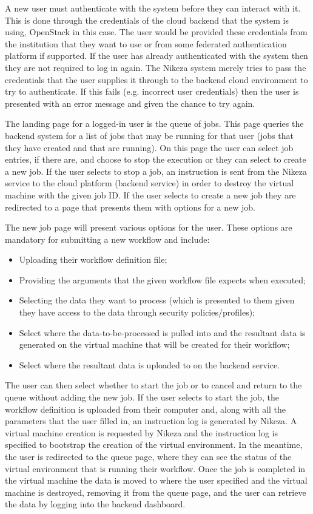  A new user must authenticate with the system before they can interact with it. This is done through the credentials of the cloud backend that the system is using, OpenStack in this case. The user would be provided these credentials from the institution that they want to use or from some federated authentication platform if supported. If the user has already authenticated with the system then they are not required to log in again. The Nikeza system merely tries to pass the credentials that the user supplies it through to the backend cloud environment to try to authenticate. If this fails (e.g. incorrect user credentials) then the user is presented with an error message and given the chance to try again.

The landing page for a logged-in user is the queue of jobs. This page queries the backend system for a list of jobs that may be running for that user (jobs that they have created and that are running). On this page the user can select job entries, if there are, and choose to stop the execution or they can select to create a new job. If the user selects to stop a job, an instruction is sent from the Nikeza service to the cloud platform (backend service) in order to destroy the virtual machine with the given job ID. If the user selects to create a new job they are redirected to a page that presents them with options for a new job.

The new job page will present various options for the user. These options are mandatory for submitting a new workflow and include:
\begin{itemize}
    \item Uploading their workflow definition file;
    \item Providing the arguments that the given workflow file expects when executed;
    \item Selecting the data they want to process (which is presented to them given they have access to the data through security policies/profiles);
    \item Select where the data-to-be-processed is pulled into and the resultant data is generated on the virtual machine that will be created for their workflow;
    \item Select where the resultant data is uploaded to on the backend service. 
\end{itemize}

The user can then select whether to start the job or to cancel and return to the queue without adding the new job. If the user selects to start the job, the workflow definition is uploaded from their computer and, along with all the parameters that the user filled in, an instruction log is generated by Nikeza. A virtual machine creation is requested by Nikeza and the instruction log is specified to bootstrap the creation of the virtual environment. In the meantime, the user is redirected to the queue page, where they can see the status of the virtual environment that is running their workflow. Once the job is completed in the virtual machine the data is moved to where the user specified and the virtual machine is destroyed, removing it from the queue page, and the user can retrieve the data by logging into the backend dashboard.

